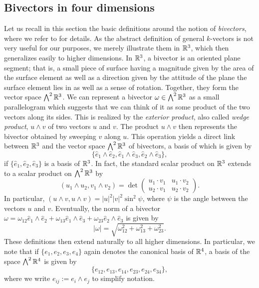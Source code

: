 \subsection{Bivectors in four dimensions}
\label{sec:bivectors}
Let us recall in this section the basic definitions around the notion of \emph{bivectors}, where we refer to \cite{Lounesto2006} for details. As the abstract definition of general $k$-vectors is not very useful for our purposes, we merely illustrate them in $\mathbb{R}^3$, which then generalizes easily to higher dimensions. In $\mathbb{R}^3$, a bivector is an oriented plane segment; that is, a small piece of surface having a magnitude given by the area of the surface element as well as a direction given by the attitude of the plane the surface element lies in as well as a sense of rotation. Together, they form the vector space $\bigwedge^2 \mathbb{R}^3$. We can represent a bivector $\omega \in \bigwedge^2 \mathbb{R}^3$ as a small parallelogram which suggests that we can think of it as some product of the two vectors along its sides. This is realized by the \emph{exterior product}, also called \emph{wedge product}, $u \wedge v$ of two vectors $u$ and $v$. The product $u \wedge v$ then represents the bivector obtained by sweeping $v$ along $u$. This operation yields a direct link between $\mathbb{R}^3$ and the vector space $\bigwedge^2 \mathbb{R}^3$ of bivectors, a basis of which is given by
\begin{equation}
 \{\hat{e}_1 \wedge \hat{e}_2, \hat{e}_1 \wedge \hat{e}_3, \hat{e}_2 \wedge \hat{e}_3\},
\end{equation}
if $\{\hat{e}_1, \hat{e}_2, \hat{e}_3\}$ is a basis of $\mathbb{R}^3$. In fact, the standard scalar product on $\mathbb{R}^3$ extends to a scalar product on $\bigwedge^2 \mathbb{R}^3$ by
\begin{equation}
( u_1 \wedge u_2 , v_1 \wedge v_2 ) = \det \left (\begin{array}{cc}
u_1 \cdot v_1 & u_1 \cdot v_2 \\ 
u_2 \cdot v_1 & u_2 \cdot v_2
\end{array}  \right).
\end{equation}
In particular, $( u \wedge v, u \wedge v ) = |u|^2 |v|^2 \sin^2\psi$, where $\psi$ is the angle between the vectors $u$ and $v$. Eventually, the norm of a bivector $\omega = \omega_{12} \hat{e}_1 \wedge \hat{e}_2 + \omega_{13} \hat{e}_1 \wedge \hat{e}_3 + \omega_{23} \hat{e}_2 \wedge \hat{e}_3$ is given by
\begin{equation}
|\omega| = \sqrt{\omega_{12}^2 + \omega_{13}^2 + \omega_{23}^2}.
\end{equation}
These definitions then extend naturally to all higher dimensions. In particular, we note that if $\{e_1, e_2, e_3, e_4\}$ again denotes the canonical basis of $\mathbb{R}^4$, a basis of the space $\bigwedge^2 \mathbb{R}^4$ is given by
\begin{equation}
\{e_{12}, e_{13}, e_{14}, e_{23}, e_{24}, e_{34}\},
\end{equation}
where we write $e_{ij} := e_i \wedge e_j$ to simplify notation.

